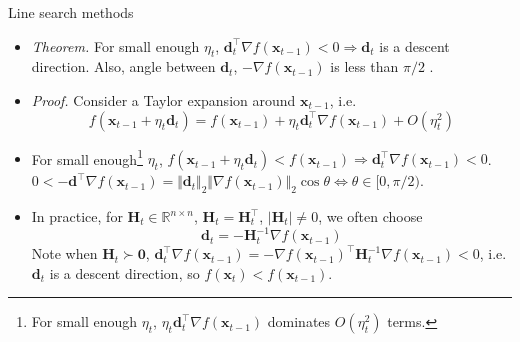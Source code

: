 \documentclass{beamer}
\numberwithin{equation}{section}
\begin{document}
\begin{frame}{Line search methods}
    \begin{itemize}
        \item
        \textit{Theorem.} For small enough $ \eta_t $, $ \mathbf{d}_t^\top
        \nabla f(\mathbf{x}_{t - 1}) < 0 \Rightarrow \mathbf{d}_t $ is a
        descent direction. Also, angle between $ \mathbf{d}_t $,
        $ -\nabla f(\mathbf{x}_{t - 1}) $ is less than $ \pi / 2 $
        \cite{nocedal_opt}.

        \item
        \textit{Proof.} Consider a Taylor expansion around
        $ \mathbf{x}_{t - 1} $, i.e.
        \begin{equation*}
            f(\mathbf{x}_{t - 1} + \eta_t\mathbf{d}_t) =
            f(\mathbf{x}_{t - 1}) + \eta_t\mathbf{d}_t^\top
            \nabla f(\mathbf{x}_{t - 1}) + O(\eta_t^2)
        \end{equation*}

        \item
        For small enough\footnote{
            For small enough $ \eta_t $, $ \eta_t\mathbf{d}_t^\top
            \nabla f(\mathbf{x}_{t - 1}) $ dominates $ O(\eta_t^2) $ terms.
        } $ \eta_t $, $ f(\mathbf{x}_{t - 1} + \eta_t\mathbf{d}_t) <
        f(\mathbf{x}_{t - 1}) \Rightarrow \mathbf{d}_t^\top
        \nabla f(\mathbf{x}_{t - 1}) < 0 $. $ 0 < -\mathbf{d}^\top
        \nabla f(\mathbf{x}_{t - 1}) = \Vert\mathbf{d}_t\Vert_2
        \Vert\nabla f(\mathbf{x}_{t - 1})\Vert_2\cos\theta \Leftrightarrow
        \theta \in [0, \pi / 2) $.
        \item
        In practice, for $ \mathbf{H}_t \in \mathbb{R}^{n \times n} $,
        $ \mathbf{H}_t = \mathbf{H}_t^\top $, $ |\mathbf{H}_t| \ne 0 $, we
        often choose \cite{nocedal_opt}
        \begin{equation} \label{eq:gen_descent_step}
            \mathbf{d}_t = -\mathbf{H}_t^{-1}\nabla f(\mathbf{x}_{t - 1})
        \end{equation}
        Note when $ \mathbf{H}_t \succ \mathbf{0} $, $ \mathbf{d}_t^\top
        \nabla f(\mathbf{x}_{t - 1}) = -\nabla f(\mathbf{x}_{t - 1})^\top
        \mathbf{H}_t^{-1}\nabla f(\mathbf{x}_{t - 1}) < 0 $, i.e.
        $ \mathbf{d}_t $ is a descent direction, so
        $ f(\mathbf{x}_t) < f(\mathbf{x}_{t - 1}) $.
    \end{itemize}
\end{frame}
\end{document}
